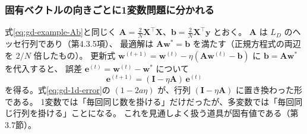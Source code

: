 \subsubsection{固有ベクトルの向きごとに1変数問題に分かれる}

式\eqref{eq:gd-example-Ab}と同じく $\bm{A} = \frac{2}{N}\bm{X}^\top\bm{X}$、$\bm{b} = \frac{2}{N}\bm{X}^\top\bm{y}$ とおく。
$\bm{A}$ は $L_D$ のヘッセ行列であり（第4.3.5項）、
最適解は $\bm{A}\bm{w}^* = \bm{b}$ を満たす（正規方程式の両辺を $2/N$ 倍したもの）。
更新式 $\bm{w}^{(t+1)} = \bm{w}^{(t)} - \eta(\bm{A}\bm{w}^{(t)} - \bm{b})$ に $\bm{b} = \bm{A}\bm{w}^*$ を代入すると、
誤差 $\bm{e}^{(t)} = \bm{w}^{(t)} - \bm{w}^*$ について
\begin{equation}
  \bm{e}^{(t+1)} = (\bm{I} - \eta\bm{A})\,\bm{e}^{(t)}
  \label{eq:gd-error}
\end{equation}
を得る。式\eqref{eq:gd-1d-error}の $(1 - 2a\eta)$ が、行列 $(\bm{I} - \eta\bm{A})$ に置き換わった形である。
1変数では「毎回同じ数を掛ける」だけだったが、多変数では「毎回同じ行列を掛ける」ことになる。
これを見通しよく扱う道具が固有値である（第3.7節）。

